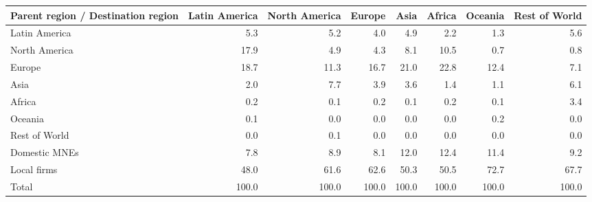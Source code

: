 \begin{tabular}{lrrrrrrr}
\toprule
Parent region / Destination region & Latin America & North America & Europe & Asia & Africa & Oceania & Rest of World \\
\midrule
Latin America & 5.3 & 5.2 & 4.0 & 4.9 & 2.2 & 1.3 & 5.6 \\
North America & 17.9 & 4.9 & 4.3 & 8.1 & 10.5 & 0.7 & 0.8 \\
Europe & 18.7 & 11.3 & 16.7 & 21.0 & 22.8 & 12.4 & 7.1 \\
Asia & 2.0 & 7.7 & 3.9 & 3.6 & 1.4 & 1.1 & 6.1 \\
Africa & 0.2 & 0.1 & 0.2 & 0.1 & 0.2 & 0.1 & 3.4 \\
Oceania & 0.1 & 0.0 & 0.0 & 0.0 & 0.0 & 0.2 & 0.0 \\
Rest of World & 0.0 & 0.1 & 0.0 & 0.0 & 0.0 & 0.0 & 0.0 \\
Domestic MNEs & 7.8 & 8.9 & 8.1 & 12.0 & 12.4 & 11.4 & 9.2 \\
Local firms & 48.0 & 61.6 & 62.6 & 50.3 & 50.5 & 72.7 & 67.7 \\
\midrule
Total & 100.0 & 100.0 & 100.0 & 100.0 & 100.0 & 100.0 & 100.0 \\
\bottomrule
\end{tabular}
